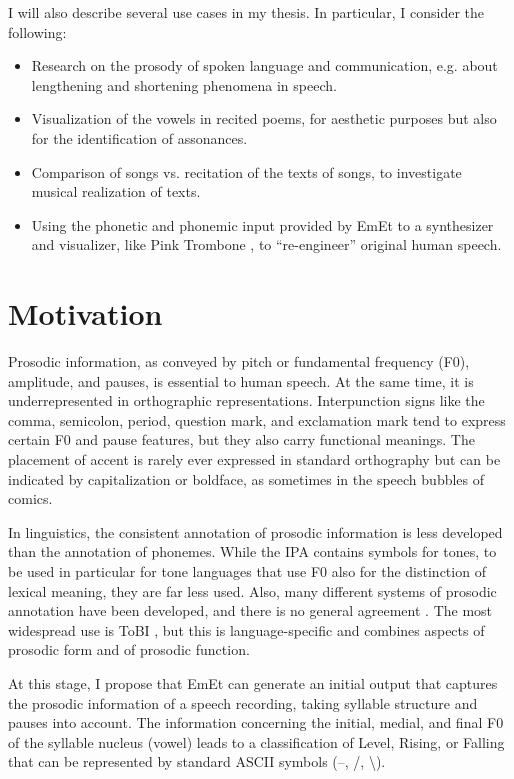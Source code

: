 I will also describe several use cases in my thesis. In particular, I consider the following:

\begin{itemize}
\item Research on the prosody of spoken language and communication, e.g. about lengthening and shortening phenomena in speech.
\item Visualization of the vowels in recited poems, for aesthetic purposes but also for the identification of assonances.
\item Comparison of songs vs. recitation of the texts of songs, to investigate musical realization of texts.
\item Using the phonetic and phonemic input provided by EmEt to a synthesizer and visualizer, like Pink Trombone \cite{rosa2017pinktrombone}, to “re-engineer” original human speech.
\end{itemize}

\section{Motivation}

Prosodic information, as conveyed by pitch or fundamental frequency (F0), amplitude, and pauses, is essential to human speech. At the same time, it is underrepresented in orthographic representations. Interpunction signs like the comma, semicolon, period, question mark, and exclamation mark tend to express certain F0 and pause features, but they also carry functional meanings. The placement of accent is rarely ever expressed in standard orthography but can be indicated by capitalization or boldface, as sometimes in the speech bubbles of comics.

In linguistics, the consistent annotation of prosodic information is less developed than the annotation of phonemes. While the IPA contains symbols for tones, to be used in particular for tone languages that use F0 also for the distinction of lexical meaning, they are far less used. Also, many different systems of prosodic annotation have been developed, and there is no general agreement \cite{hirst2022}. The most widespread use is ToBI \cite{beckmann2006}, but this is language-specific and combines aspects of prosodic form and of prosodic function.

At this stage, I propose that EmEt can generate an initial output that captures the prosodic information of a speech recording, taking syllable structure and pauses into account. The information concerning the initial, medial, and final F0 of the syllable nucleus (vowel) leads to a classification of Level, Rising, or Falling that can be represented by standard ASCII symbols (–, /, \textbackslash).

